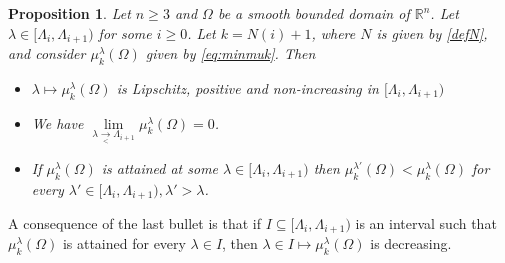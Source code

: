 \documentclass[10pt]{amsart}
\numberwithin{equation}{section}
\newcommand{\R}{\mathbb{R}}
\newcommand{\Om}{\Omega}
\newcommand{\mkl}{\mu_{k}^{\lambda}}
\theoremstyle{plain}
\newtheorem{prop}{Proposition}[section]%
\theoremstyle{remark}
\begin{document}
\begin{prop} \label{prop:C0:mkl}
Let $n \ge 3$ and $\Om$ be a smooth bounded domain of $\R^n$. Let $\lambda \in [\Lambda_i, \Lambda_{i+1})$ for some $i \ge 0$. Let $k = N(i)+1$, where $N$ is given by \eqref{defN}, and consider $\mkl(\Om)$ given by \eqref{eq:minmuk}. Then 
\begin{itemize}
\item $\lambda \mapsto \mkl(\Om)$ is Lipschitz, positive and non-increasing in $[\Lambda_i, \Lambda_{i+1})$
\item We have $   \lim \limits_{\lambda \underset{< }{\to} \Lambda_{i+1}} \mkl(\Om)= 0$.
\item If $\mkl(\Om)$ is attained at some $\lambda \in  [\Lambda_i, \Lambda_{i+1})$ then $\mu_k^{\lambda'}(\Om) < \mkl(\Om)$ for every $\lambda' \in  [\Lambda_i, \Lambda_{i+1}), \lambda' > \lambda$. 
\end{itemize}
\end{prop}
A consequence of the last bullet is that if $I \subseteq [\Lambda_i, \Lambda_{i+1})$ is an interval such that $\mkl(\Om)$ is attained for every $\lambda \in I$, then $\lambda \in I \mapsto \mkl(\Om)$ is decreasing. 
\end{document}
